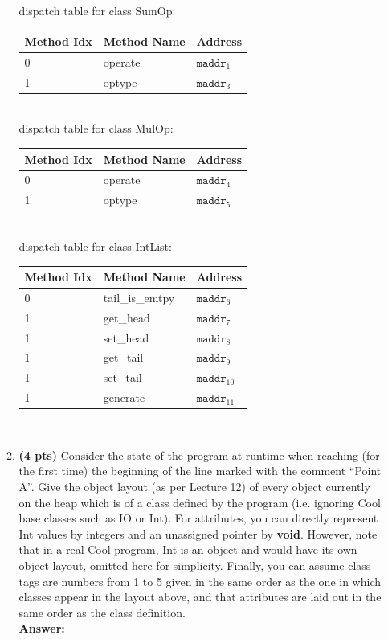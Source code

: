 \documentclass[11pt]{article}
\begin{document}
\begin{enumerate}
\begin{enumerate}
	dispatch table for class SumOp: \\
	\begin{tabular}{ | l | l | l | }
    \hline
    Method Idx & Method Name & Address \\
    \hline
    0 & operate & $\mathtt{maddr}_{1}$ \\
    \hline
    1 & optype & $\mathtt{maddr}_{3}$ \\
    \hline
    \end{tabular} \\
	
	dispatch table for class MulOp: \\
	\begin{tabular}{ | l | l | l | }
    \hline
    Method Idx & Method Name & Address \\
    \hline
    0 & operate & $\mathtt{maddr}_{4}$ \\
    \hline
    1 & optype & $\mathtt{maddr}_{5}$ \\
    \hline
    \end{tabular} \\
	
	dispatch table for class IntList: \\
	\begin{tabular}{ | l | l | l | }
    \hline
    Method Idx & Method Name & Address \\
    \hline
    0 & tail\_is\_emtpy & $\mathtt{maddr}_{6}$ \\
    \hline
    1 & get\_head & $\mathtt{maddr}_{7}$ \\
	\hline
    1 & set\_head & $\mathtt{maddr}_{8}$ \\
	\hline
    1 & get\_tail & $\mathtt{maddr}_{9}$ \\
	\hline
    1 & set\_tail & $\mathtt{maddr}_{10}$ \\
	\hline
    1 & generate & $\mathtt{maddr}_{11}$ \\
	\hline
    \end{tabular} \\
    
   \newpage
    \item \textbf{(4 pts)} Consider the state of the program at runtime when reaching (for the first time) the beginning of the line marked with the comment ``Point A''. Give the object layout (as per Lecture 12) of every object currently on the heap which is of a class defined by the program (i.e. ignoring Cool base classes such as IO or Int). For attributes, you can directly represent Int values by integers and an unassigned pointer by \textbf{void}. However, note that in a real Cool program, Int is an object and would have its own object layout, omitted here for simplicity. Finally, you can assume class tags are numbers from 1 to 5 given in the same order as the one in which classes appear in the layout above, and that attributes are laid out in the same order as the class definition.\\
    \textbf{Answer:} \\
	

\end{enumerate}
\end{enumerate}
\end{document}
